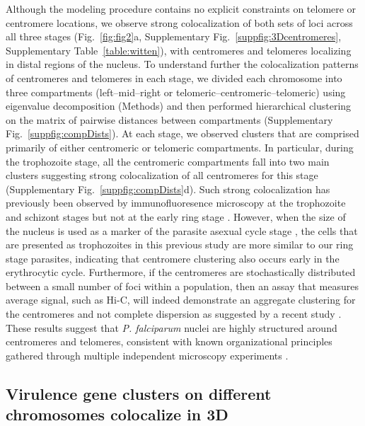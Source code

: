 Although the modeling procedure contains no explicit constraints on telomere or centromere locations, we observe strong colocalization of both sets of loci across all three stages (Fig.~\ref{fig:fig2}a, Supplementary Fig.~\ref*{suppfig:3Dcentromeres}, Supplementary Table~\ref*{table:witten}), with centromeres and telomeres localizing in distal regions of the nucleus. To understand further the colocalization patterns of centromeres and telomeres in each stage, we divided each chromosome into three compartments (left--mid--right or telomeric--centromeric--telomeric) using eigenvalue decomposition (Methods) and then performed hierarchical clustering on the matrix of pairwise distances between compartments (Supplementary Fig.~\ref*{suppfig:compDists}). At each stage, we observed clusters that are comprised primarily of either centromeric or telomeric compartments. In particular, during the trophozoite stage, all the centromeric compartments fall into two main clusters suggesting strong colocalization of all centromeres for this stage (Supplementary Fig.~\ref*{suppfig:compDists}d). Such strong colocalization has previously been observed by immunofluoresence microscopy at the trophozoite and schizont stages but not at the early ring stage \citep{hoeijmakers:plasmodium}. However, when the size of the nucleus is used as a marker of the parasite asexual cycle stage \citep{bannister:making, weiner:3d}, the cells that are presented as trophozoites in this previous study \citep{hoeijmakers:plasmodium} are more similar to our ring stage parasites, indicating that centromere clustering also occurs early in the erythrocytic cycle. Furthermore, if the centromeres are stochastically distributed between a small number of foci within a population, then an assay that measures average signal, such as Hi-C, will indeed demonstrate an aggregate clustering for the centromeres and not complete dispersion as suggested by a recent study \citep{lemieux:genome-wide}. These results suggest that {\em P. falciparum} nuclei are highly structured around centromeres and telomeres, consistent with known organizational principles gathered through multiple independent microscopy experiments \citep{duraisingh:heterochromatin, dzikowski:mechanisms, lopez-rubio:genome-wide, hoeijmakers:plasmodium}.


\subsection*{Virulence gene clusters on different chromosomes colocalize in 3D}

